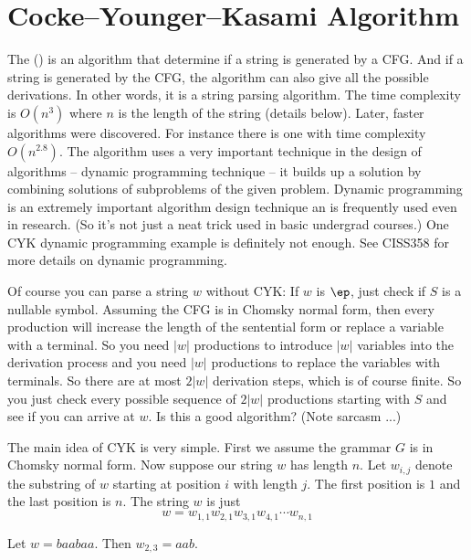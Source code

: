 \section{Cocke--Younger--Kasami Algorithm}

The
 ()
is an algorithm that determine if a string is generated by a CFG.
And if a string is generated by the CFG,
the algorithm can also give all the possible derivations.
In other words, it is a string parsing algorithm.
The time complexity is $O(n^3)$ where $n$ is the length of the string
(details below).
Later, faster algorithms were discovered.
For instance there is one with time complexity $O(n^{2.8})$.
The algorithm uses a very important technique in the design of algorithms
-- dynamic programming technique -- it builds up a solution by combining
solutions of subproblems of the given problem. 
Dynamic programming is an extremely important algorithm design technique
an is frequently used even in research.
(So it's not just a neat trick used in basic undergrad courses.)
One CYK dynamic programming example is definitely not enough.
See CISS358 for more details on dynamic programming.

Of course you can parse a string $w$ without CYK:
If $w$ is $\ep$, just check if $S$ is a nullable symbol.
Assuming the CFG is in Chomsky normal form, then every
production will increase the length of the sentential form
or replace a variable with a terminal.
So you need $|w|$ productions to introduce $|w|$ variables into the
derivation process and you need $|w|$ productions to replace the variables
with terminals. So there are at most $2|w|$ derivation steps, which is
of course finite.
So you just check every possible sequence of $2|w|$ productions starting
with $S$ and see if you can arrive at $w$.
Is this a good algorithm?
(Note sarcasm ...)

The main idea of CYK is very simple.
First we assume the grammar $G$ is in Chomsky normal form.
Now suppose our string $w$ has length $n$.
Let $w_{i,j}$ denote the substring of $w$ starting at position $i$ with 
length $j$.
The first position is $1$ and the last position is $n$.
The string $w$ is just
\[
w = w_{1,1} w_{2,1} w_{3,1} w_{4,1} \cdots w_{n,1}
\]

\begin{eg} 
Let $w = baabaa$. Then $w_{2,3} = aab$.
\end{eg}


